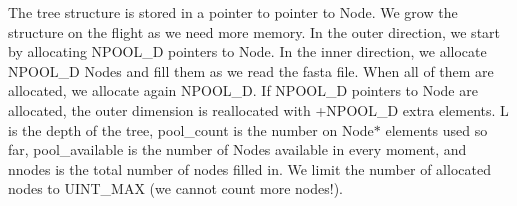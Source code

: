 The tree structure is stored in a pointer to pointer to Node. We grow the structure on the flight as we need more memory. In the outer direction, we start by allocating N\+P\+O\+O\+L\+\_\+D pointers to Node. In the inner direction, we allocate N\+P\+O\+O\+L\+\_\+D Nodes and fill them as we read the fasta file. When all of them are allocated, we allocate again N\+P\+O\+O\+L\+\_\+D. If N\+P\+O\+O\+L\+\_\+D pointers to Node are allocated, the outer dimension is reallocated with +\+N\+P\+O\+O\+L\+\_\+D extra elements. L is the depth of the tree, pool\+\_\+count is the number on Node$\ast$ elements used so far, pool\+\_\+available is the number of Nodes available in every moment, and nnodes is the total number of nodes filled in. We limit the number of allocated nodes to U\+I\+N\+T\+\_\+\+M\+A\+X (we cannot count more nodes!). 

